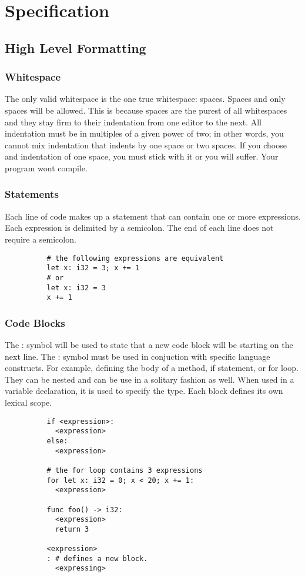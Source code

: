 \documentclass{article}
\newcommand{\centersec}[1]{\section*{\hfil #1 \hfil}}
\newcommand{\subcentersec}[1]{\subsection*{\hfil #1 \hfil}}
\newcommand{\subsubcentersec}[1]{\subsubsection*{\hfil #1 \hfil}}
\begin{document}
  \centersec{Specification}
    \subcentersec{High Level Formatting}
      \subsubcentersec{Whitespace}
        The only valid whitespace is the one true whitespace: spaces. Spaces and only spaces will be allowed.
        This is because spaces are the purest of all whitespaces and they stay firm to their indentation
        from one editor to the next. All indentation must be in multiples of a given power of two; in other words,
        you cannot mix indentation that indents by one space or two spaces. If you choose and indentation of
        one space, you must stick with it or you will suffer. Your program wont compile.

      \subsubcentersec{Statements}
        Each line of code makes up a statement that can contain one or more expressions. Each
        expression is delimited by a semicolon. The end of each line does not require a semicolon.
        \begin{verbatim}
          # the following expressions are equivalent
          let x: i32 = 3; x += 1
          # or
          let x: i32 = 3
          x += 1
        \end{verbatim}

      \subsubcentersec{Code Blocks}
        The : symbol will be used to state that a new code block will be starting on the next line. The
        : symbol must be used in conjuction with specific language constructs. For example, defining the
        body of a method, if statement, or for loop. They can be nested and can be use in a solitary
        fashion as well. When used in a variable declaration, it is used to specify the type.
        Each block defines its own lexical scope.
        \begin{verbatim}
          if <expression>:
            <expression>
          else:
            <expression>

          # the for loop contains 3 expressions
          for let x: i32 = 0; x < 20; x += 1:
            <expression>

          func foo() -> i32:
            <expression>
            return 3

          <expression>
          : # defines a new block.
            <expressing>
        \end{verbatim}
\end{document}
